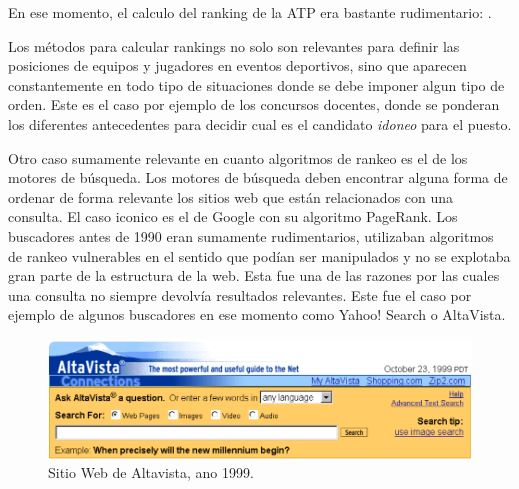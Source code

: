 En ese momento, el calculo del ranking de la ATP era bastante rudimentario:  \cite{nyt}.

Los métodos para calcular rankings no solo son relevantes para definir las posiciones de equipos y jugadores en eventos deportivos, sino que aparecen constantemente en todo tipo de situaciones donde se debe imponer algun tipo de orden. Este es el caso por ejemplo de los concursos docentes, donde se ponderan los diferentes antecedentes para decidir cual es el candidato \textit{idoneo} para el puesto.

Otro caso sumamente relevante en cuanto algoritmos de rankeo es el de los motores de búsqueda. Los motores de búsqueda deben encontrar alguna forma de ordenar de forma relevante los sitios web que están relacionados con una consulta. El caso iconico es el de Google con su algoritmo PageRank. Los buscadores antes de 1990 eran sumamente rudimentarios, utilizaban algoritmos de rankeo vulnerables en el sentido que podían ser manipulados y no se explotaba gran parte de la estructura de la web. Esta fue una de las razones por las cuales una consulta no siempre devolvía resultados relevantes. Este fue el caso por ejemplo de algunos buscadores en ese momento como Yahoo! Search o AltaVista.

\begin{figure}[H]
  \centering
  \includegraphics[scale=0.5]{images/altavista}
  \caption{Sitio Web de Altavista, ano 1999.}
\end{figure}

